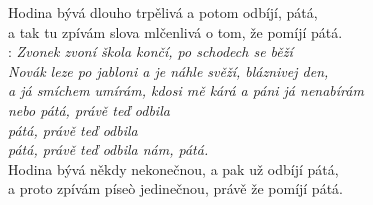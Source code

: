 
Hodina bývá dlouho trpělivá a potom odbíjí,\hspace{1cm} pátá,\\
a tak tu zpívám slova mlčenlivá o tom, že pomíjí pátá.\\

\textregistered: \emph{Zvonek zvoní škola končí, po schodech se běží\\
Novák leze po jabloni a je náhle svěží, bláznivej den,\\
a já smíchem umírám, kdosi mě kárá a páni já nenabírám\\
nebo pátá,\hspace{0,5cm} právě teď odbila\\
pátá,\hspace{0,5cm} právě teď odbila\\
pátá,\hspace{0,5cm} právě teď odbila nám, pátá.}\\

Hodina bývá někdy nekonečnou, a pak už odbíjí pátá,\\
a proto zpívám píseò jedinečnou, právě že pomíjí pátá.\\

\textregistered

\newpage

